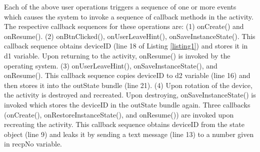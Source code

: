 \documentclass[10pt]{elsarticle}
\begin{document}
Each of the above user operations triggers a sequence of one or more events which causes the system to invoke a sequence of callback methods in the activity. The respective callback sequences for these operations are: (1) {\ttfamily onCreate()} and {\ttfamily onResume()}. (2) {\ttfamily onBtnClicked()}, {\ttfamily onUserLeaveHint()}, {\ttfamily onSaveInstanceState()}. This callback sequence obtains deviceID (line 18 of Listing \ref{listing1}) and stores it in {\ttfamily d1} variable. Upon returning to the activity, {\ttfamily onResume()} is invoked by the operating system. (3) {\ttfamily onUserLeaveHint()}, {\ttfamily onSaveInstanceState()}, and {\ttfamily onResume()}. This callback sequence copies deviceID to {\ttfamily d2} variable (line 16) and then stores it into the {\ttfamily outState} bundle (line 21). (4) Upon rotation of the device, the activity is destroyed and recreated. Upon destroying, {\ttfamily onSaveInstanceState()} is invoked which stores the deviceID in the {\ttfamily outState} bundle again. Three callbacks ({\ttfamily onCreate()}, {\ttfamily onRestoreInstanceState()}, and {\ttfamily onResume()}) are invoked upon recreating the activity. This callback sequence obtains deviceID from the {\ttfamily state} object (line 9) and leaks it by sending a text message (line 13) to a number given in {\ttfamily recpNo} variable. 




 \begin{comment}
\begin{minipage}{0.94\linewidth}

\end{minipage}
\end{comment}
\end{document}
